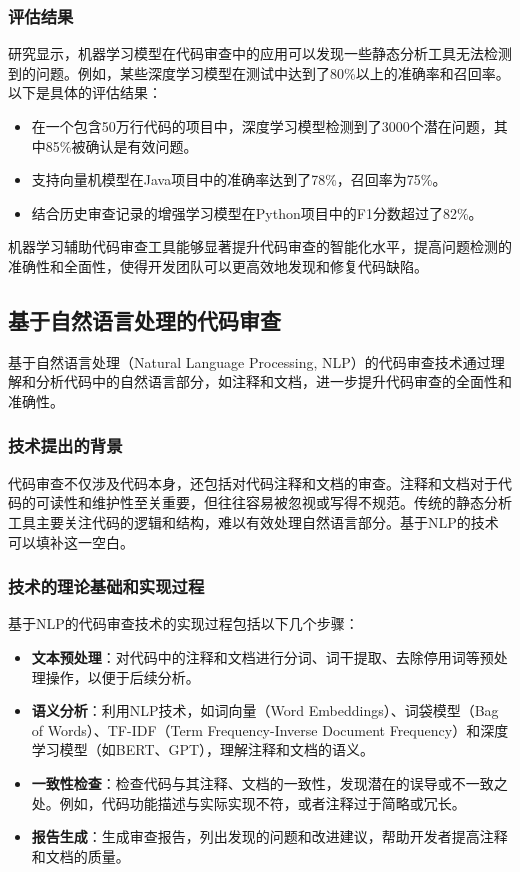 \documentclass{article}
\begin{document}
\subsubsection{评估结果}

研究显示，机器学习模型在代码审查中的应用可以发现一些静态分析工具无法检测到的问题。例如，某些深度学习模型在测试中达到了80\%以上的准确率和召回率。以下是具体的评估结果：

\begin{itemize}
    \item 在一个包含50万行代码的项目中，深度学习模型检测到了3000个潜在问题，其中85\%被确认是有效问题。
    \item 支持向量机模型在Java项目中的准确率达到了78\%，召回率为75\%。
    \item 结合历史审查记录的增强学习模型在Python项目中的F1分数超过了82\%。
\end{itemize}

机器学习辅助代码审查工具能够显著提升代码审查的智能化水平，提高问题检测的准确性和全面性，使得开发团队可以更高效地发现和修复代码缺陷。

\subsection{基于自然语言处理的代码审查}

基于自然语言处理（Natural Language Processing, NLP）的代码审查技术通过理解和分析代码中的自然语言部分，如注释和文档，进一步提升代码审查的全面性和准确性。

\subsubsection{技术提出的背景}

代码审查不仅涉及代码本身，还包括对代码注释和文档的审查。注释和文档对于代码的可读性和维护性至关重要，但往往容易被忽视或写得不规范。传统的静态分析工具主要关注代码的逻辑和结构，难以有效处理自然语言部分。基于NLP的技术可以填补这一空白。

\subsubsection{技术的理论基础和实现过程}

基于NLP的代码审查技术的实现过程包括以下几个步骤：

\begin{itemize}
    \item \textbf{文本预处理}：对代码中的注释和文档进行分词、词干提取、去除停用词等预处理操作，以便于后续分析。
    \item \textbf{语义分析}：利用NLP技术，如词向量（Word Embeddings）、词袋模型（Bag of Words）、TF-IDF（Term Frequency-Inverse Document Frequency）和深度学习模型（如BERT、GPT），理解注释和文档的语义。
    \item \textbf{一致性检查}：检查代码与其注释、文档的一致性，发现潜在的误导或不一致之处。例如，代码功能描述与实际实现不符，或者注释过于简略或冗长。
    \item \textbf{报告生成}：生成审查报告，列出发现的问题和改进建议，帮助开发者提高注释和文档的质量。
\end{itemize}
\end{document}
